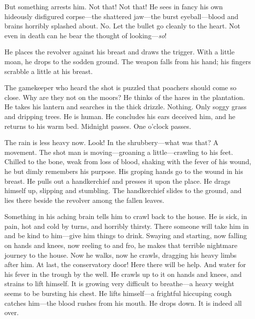 \begin{dialogue}
\smallskip

But something arrests him. Not that! Not that! He sees in fancy his own hideously disfigured corpse\allowbreak---\allowbreak the shattered jaw\allowbreak---\allowbreak the burst eyeball\allowbreak---\allowbreak blood and brains horribly splashed about. No. Let the bullet go cleanly to the heart. Not even in death can he bear the thought of looking---\textit{so}!

\smallskip

He places the revolver against his breast and draws the trigger. With a little moan, he drops to the sodden ground. The weapon falls from his hand; his fingers scrabble a little at his breast.

\smallskip

The gamekeeper who heard the shot is puzzled that poachers should come so close. Why are they not on the moors? He thinks of the hares in the plantation. He takes his lantern and searches in the thick drizzle. Nothing. Only soggy grass and dripping trees. He is human. He concludes his ears deceived him, and he returns to his warm bed. Midnight passes. One o'clock passes.

\smallskip

The rain is less heavy now. Look! In the shrubbery\allowbreak---\allowbreak what was that? A movement. The shot man is moving\allowbreak---\allowbreak groaning a little\allowbreak---\allowbreak crawling to his feet. Chilled to the bone, weak from loss of blood, shaking with the fever of his wound, he but dimly remembers his purpose. His groping hands go to the wound in his breast. He pulls out a handkerchief and presses it upon the place. He drags himself up, slipping and stumbling. The handkerchief slides to the ground, and lies there beside the revolver among the fallen leaves.

\smallskip

Something in his aching brain tells him to crawl back to the house. He is sick, in pain, hot and cold by turns, and horribly thirsty. There someone will take him in and be kind to him\allowbreak---\allowbreak give him things to drink. Swaying and starting, now falling on hands and knees, now reeling to and fro, he makes that terrible nightmare journey to the house. Now he walks, now he crawls, dragging his heavy limbs after him. At last, the conservatory door! Here there will be help. And water for his fever in the trough by the well. He crawls up to it on hands and knees, and strains to lift himself. It is growing very difficult to breathe\allowbreak---\allowbreak a heavy weight seems to be bursting his chest. He lifts himself\allowbreak---\allowbreak a frightful hiccuping cough catches him\allowbreak---\allowbreak the blood rushes from his mouth. He drops down. It is indeed all over.


\end{dialogue}
